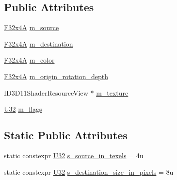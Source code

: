 \subsection*{Public Attributes}
\begin{DoxyCompactItemize}
\item 
\mbox{\hyperlink{namespacemage_adf8a58b7ee51401d839d163848a62844}{F32x4A}} \mbox{\hyperlink{structmage_1_1rendering_1_1anonymous__namespace_02sprite__batch_8cpp_03_1_1_sprite_info_a0fa72c66632b71fda2df06fc34994c05}{m\+\_\+source}}
\item 
\mbox{\hyperlink{namespacemage_adf8a58b7ee51401d839d163848a62844}{F32x4A}} \mbox{\hyperlink{structmage_1_1rendering_1_1anonymous__namespace_02sprite__batch_8cpp_03_1_1_sprite_info_a79a138828a5a066241472097754a3730}{m\+\_\+destination}}
\item 
\mbox{\hyperlink{namespacemage_adf8a58b7ee51401d839d163848a62844}{F32x4A}} \mbox{\hyperlink{structmage_1_1rendering_1_1anonymous__namespace_02sprite__batch_8cpp_03_1_1_sprite_info_a9727207b7efade72e6b3d9c2635f574a}{m\+\_\+color}}
\item 
\mbox{\hyperlink{namespacemage_adf8a58b7ee51401d839d163848a62844}{F32x4A}} \mbox{\hyperlink{structmage_1_1rendering_1_1anonymous__namespace_02sprite__batch_8cpp_03_1_1_sprite_info_a180c77e11aeada21375ab7c038838b29}{m\+\_\+origin\+\_\+rotation\+\_\+depth}}
\item 
I\+D3\+D11\+Shader\+Resource\+View $\ast$ \mbox{\hyperlink{structmage_1_1rendering_1_1anonymous__namespace_02sprite__batch_8cpp_03_1_1_sprite_info_a6489b50a44ce6e5a2422b832e23de660}{m\+\_\+texture}}
\item 
\mbox{\hyperlink{namespacemage_aa5d6eaabaac3cdd01873d6a3d27e90f3}{U32}} \mbox{\hyperlink{structmage_1_1rendering_1_1anonymous__namespace_02sprite__batch_8cpp_03_1_1_sprite_info_aa40209d64316e04cea5a42f13241165a}{m\+\_\+flags}}
\end{DoxyCompactItemize}
\subsection*{Static Public Attributes}
\begin{DoxyCompactItemize}
\item 
static constexpr \mbox{\hyperlink{namespacemage_aa5d6eaabaac3cdd01873d6a3d27e90f3}{U32}} \mbox{\hyperlink{structmage_1_1rendering_1_1anonymous__namespace_02sprite__batch_8cpp_03_1_1_sprite_info_a250d1878dd8e5765620a19be904d7c0b}{s\+\_\+source\+\_\+in\+\_\+texels}} = 4u
\item 
static constexpr \mbox{\hyperlink{namespacemage_aa5d6eaabaac3cdd01873d6a3d27e90f3}{U32}} \mbox{\hyperlink{structmage_1_1rendering_1_1anonymous__namespace_02sprite__batch_8cpp_03_1_1_sprite_info_af59c51b1b99c77b257a5df4b17b0ba80}{s\+\_\+destination\+\_\+size\+\_\+in\+\_\+pixels}} = 8u
\end{DoxyCompactItemize}


